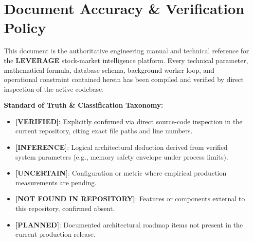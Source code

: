 \documentclass[11pt,a4paper,oneside,openany]{report}
\def\tag#1{\textsc{\textbf{[#1]}}}
\def\tag#1{\textsc{\textbf{[#1]}}}
\begin{document}
\newpage
\chapter*{Document Accuracy \& Verification Policy}

This document is the authoritative engineering manual and technical reference for the \textbf{LEVERAGE} stock-market intelligence platform. Every technical parameter, mathematical formula, database schema, background worker loop, and operational constraint contained herein has been compiled and verified by direct inspection of the active codebase.

\begin{accuracybox}
\textbf{Standard of Truth \& Classification Taxonomy:}
\begin{itemize}[leftmargin=5mm,itemsep=0.5mm]
    \item \relax \tag{VERIFIED}: Explicitly confirmed via direct source-code inspection in the current repository, citing exact file paths and line numbers.
    \item \relax \tag{INFERENCE}: Logical architectural deduction derived from verified system parameters (e.g., memory safety envelope under process limits).
    \item \relax \tag{UNCERTAIN}: Configuration or metric where empirical production measurements are pending.
    \item \relax \tag{NOT FOUND IN REPOSITORY}: Features or components external to this repository, confirmed absent.
    \item \relax \tag{PLANNED}: Documented architectural roadmap items not present in the current production release.
\end{itemize}
\end{accuracybox}

\vspace{-2mm}
\end{document}
